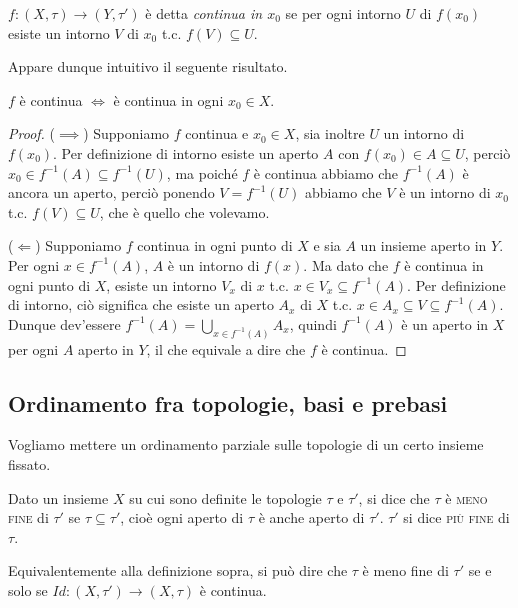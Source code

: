 \documentclass{article}
\begin{document}
\begin{defn}
	$f:(X, \tau) \rightarrow (Y, \tau')$ è detta \textit{continua in $x_0$} se
	per ogni intorno $U$ di $f(x_0)$ esiste un intorno $V$ di $x_0$ t.c. $f(V)
	\subseteq U$.
\end{defn}

Appare dunque intuitivo il seguente risultato.

\begin{thm}
	$f$ è continua $\Leftrightarrow$ è continua in ogni $x_0 \in X$.
\end{thm}

\begin{proof}
	($\implies$) Supponiamo $f$ continua e $x_0 \in X$, sia inoltre $U$ un
	intorno di $f(x_0)$. Per definizione di intorno esiste un aperto $A$ con
	$f(x_0) \in A \subseteq U$, perciò $x_0 \in f^{-1}(A) \subseteq f^{-1}(U)$,
	ma poiché $f$ è continua abbiamo che $f^{-1}(A)$ è ancora un aperto, perciò
	ponendo $V=f^{-1}(U)$ abbiamo che $V$ è un intorno di $x_0$ t.c. $f(V)
	\subseteq U$, che è quello che volevamo.

	($\Leftarrow$) Supponiamo $f$ continua in ogni punto di $X$ e sia $A$ un
	insieme aperto in $Y$. Per ogni $x \in f^{-1}(A)$, $A$ è un intorno di
	$f(x)$. Ma dato che $f$ è continua in ogni punto di $X$, esiste un intorno
	$V_x$ di $x$ t.c. $x \in V_x \subseteq f^{-1}(A)$. Per definizione di
	intorno, ciò significa che esiste un aperto $A_x$ di $X$ t.c. $x \in A_x
	\subseteq V \subseteq f^{-1}(A)$. Dunque dev'essere $\displaystyle
	f^{-1}(A)= \bigcup_{x \in f^{-1}(A)} A_x$,
	quindi $f^{-1}(A)$ è un aperto in $X$ per ogni $A$ aperto in $Y$, il che
	equivale a dire che $f$ è continua.
\end{proof}

\subsection{Ordinamento fra topologie, basi e prebasi}

Vogliamo mettere un ordinamento parziale sulle topologie di un certo insieme
fissato.

\begin{defn}
    Dato un insieme $X$ su cui sono definite le topologie $\tau$ e $\tau'$, si
    dice che $\tau$ \`e \textsc{meno fine} di $\tau'$ se $\tau \subseteq \tau'$,
    cioè ogni aperto di $\tau$ è anche aperto di $\tau'$. $\tau'$ si dice
    \textsc{più fine} di $\tau$.
\end{defn}

\begin{oss}
    Equivalentemente alla definizione sopra, si pu\`o dire che $\tau$ \`e meno
    fine di $\tau'$ se e solo se ${Id:(X,\tau')\rightarrow(X, \tau)}$ \`e
    continua.
\end{oss}
\end{document}
